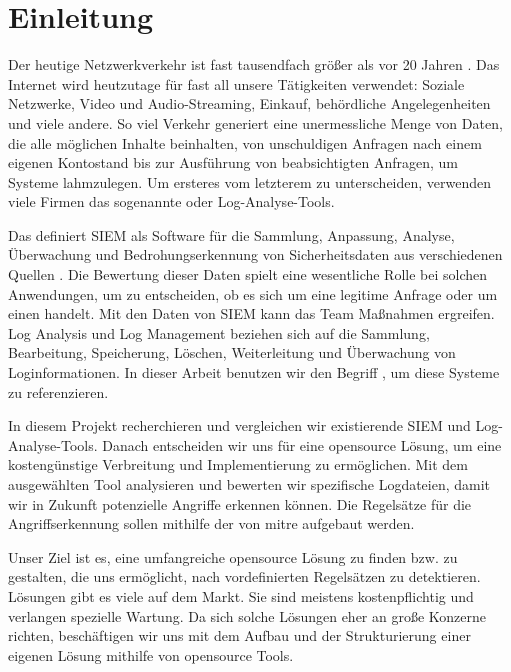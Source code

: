 \section{Einleitung}

Der heutige Netzwerkverkehr ist fast tausendfach größer als vor 20 Jahren \citep{Roser_I}. Das Internet wird heutzutage für fast all unsere Tätigkeiten verwendet: Soziale Netzwerke, Video und Audio-Streaming, Einkauf, behördliche Angelegenheiten und viele andere. So viel Verkehr generiert eine unermessliche Menge von Daten, die alle möglichen Inhalte beinhalten, von unschuldigen Anfragen nach einem eigenen Kontostand bis zur Ausführung von beabsichtigten Anfragen, um Systeme lahmzulegen. Um ersteres vom letzterem zu unterscheiden, verwenden viele Firmen das sogenannte  oder Log-Analyse-Tools. 

Das  definiert \gls{SIEM} als Software für die Sammlung, Anpassung, Analyse, Überwachung und Bedrohungserkennung von Sicherheitsdaten aus verschiedenen Quellen \citep{NIST_Definitions}. Die Bewertung dieser Daten spielt eine wesentliche Rolle bei solchen Anwendungen, um zu entscheiden, ob es sich um eine legitime Anfrage oder um einen  handelt. Mit den Daten von \gls{SIEM} kann das  Team Maßnahmen ergreifen. Log Analysis und Log Management beziehen sich auf die Sammlung, Bearbeitung, Speicherung, Löschen, Weiterleitung und Überwachung von Loginformationen. In dieser Arbeit benutzen wir den Begriff , um diese Systeme zu referenzieren.

In diesem Projekt recherchieren und vergleichen wir existierende \gls{SIEM} und Log-Analyse-Tools. Danach entscheiden wir uns für eine \gls{opensource} Lösung, um eine kostengünstige Verbreitung und Implementierung zu ermöglichen. Mit dem ausgewählten Tool analysieren und bewerten wir spezifische Logdateien, damit wir in Zukunft potenzielle Angriffe erkennen können. Die Regelsätze für die Angriffserkennung sollen mithilfe der  von \gls{mitre} aufgebaut werden.

\newpage
Unser Ziel ist es, eine umfangreiche \gls{opensource} Lösung zu finden bzw. zu gestalten, die uns ermöglicht,  nach vordefinierten Regelsätzen zu detektieren.  Lösungen gibt es viele auf dem Markt. Sie sind meistens kostenpflichtig und verlangen spezielle Wartung. Da sich solche Lösungen eher an große Konzerne richten, beschäftigen wir uns mit dem Aufbau und der Strukturierung einer eigenen Lösung mithilfe von \gls{opensource} Tools. 

